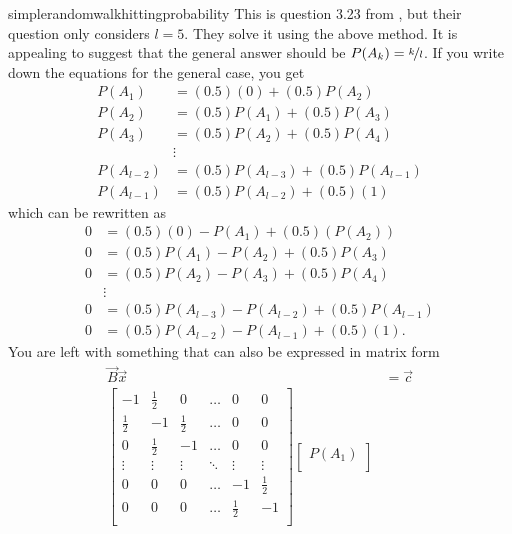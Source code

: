 \begin{answer}{simplerandomwalkhittingprobability}
This is question 3.23 from \citet{JoshiQA}, but their question only considers $l=5$.
They solve it using the above method.
It is appealing to suggest that the general answer should be
$P(A_k) = \nicefrac{k}{l}$.
If you write down the equations for the general case, you get
\begin{align*}
P(A_1) &= (0.5)(0)      + (0.5) P(A_2)  \\
P(A_2) &= (0.5) P(A_1)  + (0.5) P(A_3)  \\
P(A_3) &= (0.5) P(A_2)  + (0.5) P(A_4)  \\
 & \vdots \\
P(A_{l-2}) &= (0.5) P(A_{l-3})  + (0.5) P(A_{l-1})  \\
P(A_{l-1}) &= (0.5) P(A_{l-2})  + (0.5)(1)
\end{align*}
which can be rewritten as
\begin{align*}
0 &= (0.5)(0) - P(A_1)   + (0.5)(P(A_2)) \\
0 &= (0.5) P(A_1)  - P(A_2)  + (0.5) P(A_3)  \\
0 &= (0.5) P(A_2)  - P(A_3)  + (0.5) P(A_4)  \\
  & \vdots \\
0 &= (0.5) P(A_{l-3})  - P(A_{l-2}) + (0.5) P(A_{l-1}) \\
0 &= (0.5) P(A_{l-2})  - P(A_{l-1}) + (0.5)(1)
\text{.}
\end{align*}
You are left with something that can also be expressed in matrix form
\begin{align*}
\vec{B}\vec{x} &= \vec{c} \\
  \begin{bmatrix}
 -1           & \frac{1}{2}  & 0            &   \ldots       & 0            & 0            \\
 \frac{1}{2}  & -1           & \frac{1}{2}  &   \ldots       & 0            & 0            \\
 0            & \frac{1}{2}  & -1           &   \ldots       & 0            & 0            \\
  \vdots      & \vdots       & \vdots       &   \ddots       & \vdots       & \vdots       \\
 0            & 0            & 0            &   \ldots       & -1           & \frac{1}{2}  \\
 0            & 0            & 0            &   \ldots       & \frac{1}{2}  & -1           \\
  \end{bmatrix}
  \begin{bmatrix}
  P(A_1) \\

\end{bmatrix}
\end{align*}
\end{answer}
